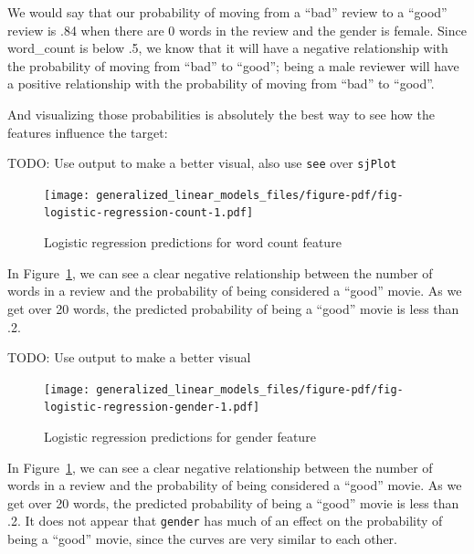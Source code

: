 \documentclass[
  letterpaper,
]{krantz}
\begin{document}
We would say that our probability of moving from a ``bad'' review to a
``good'' review is .84 when there are 0 words in the review and the
gender is female. Since word\_count is below .5, we know that it will
have a negative relationship with the probability of moving from ``bad''
to ``good''; being a male reviewer will have a positive relationship
with the probability of moving from ``bad'' to ``good''.

And visualizing those probabilities is absolutely the best way to see
how the features influence the target:

TODO: Use output to make a better visual, also use \texttt{see} over
\texttt{sjPlot}

\begin{figure}

{\centering \texttt{[image: generalized\_linear\_models\_files/figure-pdf/fig-logistic-regression-count-1.pdf]}

}

\caption{\label{fig-logistic-regression-count}Logistic regression
predictions for word count feature}

\end{figure}

In Figure~\ref{fig-logistic-regression-count}, we can see a clear
negative relationship between the number of words in a review and the
probability of being considered a ``good'' movie. As we get over 20
words, the predicted probability of being a ``good'' movie is less than
.2.

TODO: Use output to make a better visual

\begin{figure}

{\centering \texttt{[image: generalized\_linear\_models\_files/figure-pdf/fig-logistic-regression-gender-1.pdf]}

}

\caption{\label{fig-logistic-regression-gender}Logistic regression
predictions for gender feature}

\end{figure}

In Figure~\ref{fig-logistic-regression-count}, we can see a clear
negative relationship between the number of words in a review and the
probability of being considered a ``good'' movie. As we get over 20
words, the predicted probability of being a ``good'' movie is less than
.2. It does not appear that \texttt{gender} has much of an effect on the
probability of being a ``good'' movie, since the curves are very similar
to each other.
\end{document}
